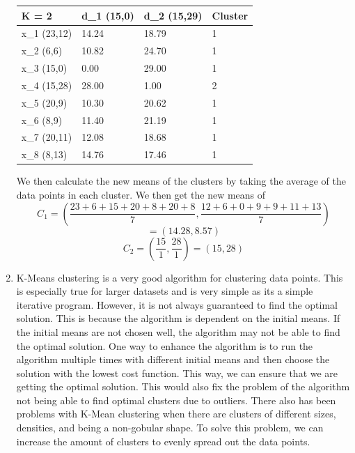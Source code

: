 \documentclass{article}
\begin{document}
\begin{enumerate}
    \begin{table}[h]
        \begin{tabular}{|l|l|l|l|}
        \hline
        K = 2        & d\_1 (15,0) & d\_2 (15,29) & Cluster \\ \hline
        x\_1 (23,12) & 14.24       & 18.79        & 1       \\ \hline
        x\_2 (6,6)   & 10.82       & 24.70        & 1       \\ \hline
        x\_3 (15,0)  & 0.00        & 29.00        & 1       \\ \hline
        x\_4 (15,28) & 28.00       & 1.00         & 2       \\ \hline
        x\_5 (20,9)  & 10.30       & 20.62        & 1       \\ \hline
        x\_6 (8,9)   & 11.40       & 21.19        & 1       \\ \hline
        x\_7 (20,11) & 12.08       & 18.68        & 1       \\ \hline
        x\_8 (8,13)  & 14.76       & 17.46        & 1       \\ \hline
        \end{tabular}
        \centering
    \end{table}

    We then calculate the new means of the clusters by taking the average of the data points in each cluster. We then get the new means of
    \[C_1 = (\frac{23 + 6 + 15 + 20 + 8 + 20 + 8}{7}, \frac{12 + 6 + 0 + 9 + 9 + 11 + 13}{7})\]
    \[= (14.28,8.57)\]
    \[C_2 = (\frac{15}{1}, \frac{28}{1}) = (15,28)\]

    \item K-Means clustering is a very good algorithm for clustering data points. This is especially true for larger datasets and is very simple as its a simple iterative program. However, it is not always guaranteed to find the optimal solution. This is because the algorithm is dependent on the initial means. If the initial means are not chosen well, the algorithm may not be able to find the optimal solution. One way to enhance the algorithm is to run the algorithm multiple times with different initial means and then choose the solution with the lowest cost function. This way, we can ensure that we are getting the optimal solution. This would also fix the problem of the algorithm not being able to find optimal clusters due to outliers. There also has been problems with K-Mean clustering when there are clusters of different sizes, densities, and being a non-gobular shape. To solve this problem, we can increase the amount of clusters to evenly spread out the data points. 

\end{enumerate}
\end{document}

